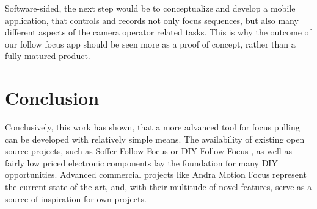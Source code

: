 \documentclass{sigchi}
\begin{document}
Software-sided, the next step would be to conceptualize and develop a mobile application, that controls and records not only focus sequences, but also many different aspects of the camera operator related tasks. This is why the outcome of our follow focus app should be seen more as a proof of concept, rather than a fully matured product.


\section{Conclusion}

Conclusively, this work has shown, that a more advanced tool for focus pulling can be developed with relatively simple means. The availability of existing open source projects, such as Soffer Follow Focus \cite{soffer} or DIY Follow Focus \cite{diyff}, as well as fairly low priced electronic components lay the foundation for many DIY opportunities. Advanced commercial projects like Andra Motion Focus \cite{andra} represent the current state of the art, and, with their multitude of novel features, serve as a source of inspiration for own projects.



\end{document}
